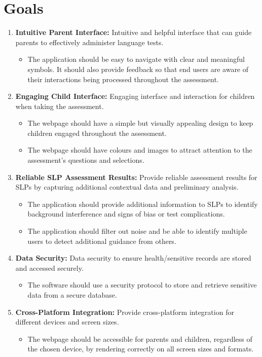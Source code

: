 \documentclass{article}
\begin{document}
\section{Goals}
\begin{enumerate}
    \item \textbf{Intuitive Parent Interface: }Intuitive and helpful interface that can guide parents to effectively administer language tests.
    \begin{itemize}
        \item The application should be easy to navigate with clear and meaningful symbols.
        It should also provide feedback so that end users are aware of their interactions being processed throughout the assessment.
    \end{itemize}
    
    \item \textbf{Engaging Child Interface: }Engaging interface and interaction for children when taking the assessment.
    \begin{itemize}
        \item The webpage should have a simple but visually appealing design to keep children engaged throughout the assessment.
        \item The webpage should have colours and images to attract attention to the assessment's questions and selections.
    \end{itemize}
    
    \item \textbf{Reliable SLP Assessment Results: }Provide reliable assessment results for SLPs by capturing additional contextual data and preliminary analysis.
    \begin{itemize}
        \item The application should provide additional information to SLPs to identify background interference and signs of bias or test complications.
        \item The application should filter out noise and be able to identify multiple users to detect additional guidance from others.
    \end{itemize}
    \item \textbf{Data Security: }Data security to ensure health/sensitive records are stored and accessed securely.
    \begin{itemize}
        \item The software should use a security protocol to store and retrieve sensitive data from a secure database.
    \end{itemize}
    \item \textbf{Cross-Platform Integration: }Provide cross-platform integration for different devices and screen sizes.
    \begin{itemize}
        \item The webpage should be accessible for parents and children, regardless of the chosen device, by rendering correctly on all screen sizes and formats. 
    \end{itemize}
\end{enumerate}
\end{document}
